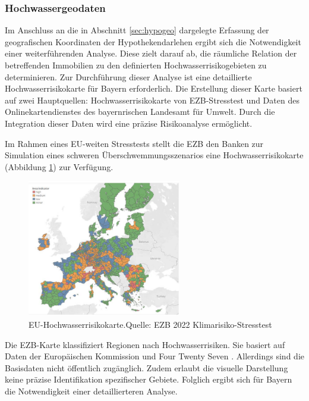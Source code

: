 \subsubsection{Hochwassergeodaten}\label{sec:hochgeo}

Im Anschluss an die in Abschnitt \ref{sec:hypogeo} dargelegte Erfassung der geografischen Koordinaten der Hypothekendarlehen ergibt sich die Notwendigkeit einer weiterführenden Analyse. Diese zielt darauf ab, die räumliche Relation der betreffenden Immobilien zu den definierten Hochwasserrisikogebieten zu determinieren. Zur Durchführung dieser Analyse ist eine detaillierte Hochwasserrisikokarte für Bayern erforderlich. Die Erstellung dieser Karte basiert auf zwei Hauptquellen: Hochwasserrisikokarte von \ac{EZB}-Stresstest und Daten des Onlinekartendienstes des bayernrischen Landesamt für Umwelt. Durch die Integration dieser Daten wird eine präzise Risikoanalyse ermöglicht.

Im Rahmen eines EU-weiten Stresstests stellt die \ac{EZB} den Banken zur Simulation eines schweren Überschwemmungsszenarios eine Hochwasserrisikokarte (Abbildung \ref{fig:euflut}) zur Verfügung.

\begin{figure}[htbp]
    \centering
    \includegraphics[width=0.6\textwidth]{figures/euflood.png} 
    \caption{EU-Hochwasserrisikokarte.Quelle: EZB 2022 Klimarisiko-Stresstest}
    \label{fig:euflut}
\end{figure}
\FloatBarrier

Die EZB-Karte klassifiziert Regionen nach Hochwasserrisiken. Sie basiert auf Daten der Europäischen Kommission und Four Twenty Seven \parencite{ECB2022ClimateStressTest}. Allerdings sind die Basisdaten nicht öffentlich zugänglich. Zudem erlaubt die visuelle Darstellung keine präzise Identifikation spezifischer Gebiete. Folglich ergibt sich für Bayern die Notwendigkeit einer detaillierteren Analyse.

